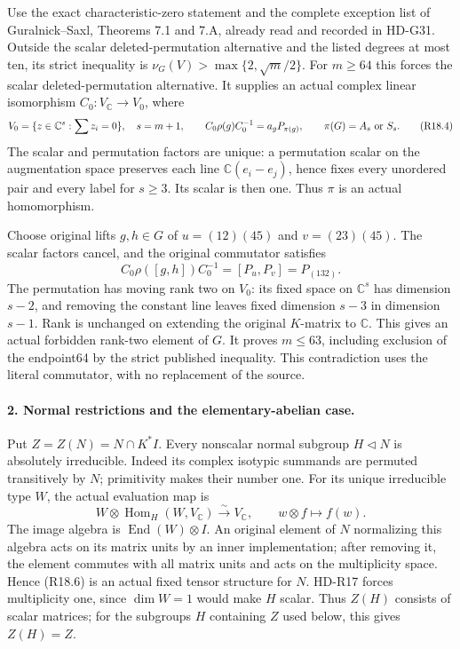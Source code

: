 Use the exact characteristic-zero statement and the complete
exception list of Guralnick--Saxl, Theorems 7.1 and 7.A,
already read and recorded in HD-G31. Outside the scalar
deleted-permutation alternative and the listed degrees at
most ten, its strict inequality is
\(\nu_G(V)>\max\{2,\sqrt m/2\}\).
For \(m\ge64\) this forces the scalar deleted-permutation
alternative. It supplies an actual complex linear isomorphism
\(C_0:V_{\mathbb C}\to V_0\), where
\[
 V_0=\{z\in\mathbb C^s:\sum z_i=0\},\quad s=m+1,
 \qquad C_0\rho(g)C_0^{-1}=a_gP_{\pi(g)},
 \qquad\pi(G)=A_s\ \hbox{or}\ S_s.                     \tag{R18.4}
\]
The scalar and permutation factors are unique: a permutation
scalar on the augmentation space preserves each line
\(\mathbb C(e_i-e_j)\), hence fixes every unordered pair
and every label for \(s\ge3\). Its scalar is then one.
Thus \(\pi\) is an actual homomorphism.

Choose original lifts \(g,h\in G\) of
\(u=(12)(45)\) and \(v=(23)(45)\). The scalar factors cancel,
and the original commutator satisfies
\[
 C_0\rho([g,h])C_0^{-1}
                   =[P_u,P_v]=P_{(132)}.                \tag{R18.5}
\]
The permutation has moving rank two on \(V_0\): its fixed
space on \(\mathbb C^s\) has dimension \(s-2\), and
removing the constant line leaves fixed dimension \(s-3\)
in dimension \(s-1\). Rank is unchanged on extending
the original \(K\)-matrix to \(\mathbb C\).
This gives an actual forbidden rank-two element of \(G\).
It proves \(m\le63\), including exclusion of the endpoint64
by the strict published inequality. This contradiction uses
the literal commutator, with no replacement of the source.

\paragraph{2. Normal restrictions and the elementary-abelian case.}
Put \(Z=Z(N)=N\cap K^*I\). Every nonscalar normal subgroup
\(H\triangleleft N\) is absolutely irreducible. Indeed its
complex isotypic summands are permuted transitively by \(N\);
primitivity makes their number one. For its unique irreducible
type \(W\), the actual evaluation map is
\[
 W\otimes\operatorname{Hom}_H(W,V_{\mathbb C})
        \xrightarrow{\sim}V_{\mathbb C},\qquad
                       w\otimes f\longmapsto f(w).       \tag{R18.6}
\]
The image algebra is \(\operatorname{End}(W)\otimes I\).
An original element of \(N\) normalizing this algebra
acts on its matrix units by an inner implementation;
after removing it, the element commutes with all matrix
units and acts on the multiplicity space. Hence (R18.6)
is an actual fixed tensor structure for \(N\). HD-R17
forces multiplicity one, since \(\dim W=1\) would make
\(H\) scalar. Thus \(Z(H)\) consists of scalar matrices;
for the subgroups \(H\) containing \(Z\) used below,
this gives \(Z(H)=Z\).

